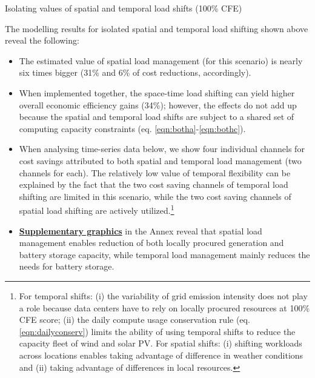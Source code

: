 \begin{frame}{Isolating values of spatial and temporal load shifts (100\% CFE)}

  {\footnotesize 

  The modelling results for isolated spatial and temporal load shifting shown above reveal the following: \\

  \begin{itemize}

    \item The estimated value of spatial load management (for this scenario) is nearly \alert{six times bigger} (31\% and 6\% of cost reductions, accordingly). 

    \item When implemented together, the space-time load shifting can yield higher overall economic efficiency gains (34\%); however, \alert{the effects do not add up} because the spatial and temporal load shifts are subject to a shared set of computing capacity constraints (eq. \ref{eqn:botha}-\ref{eqn:bothc}).

    \item When analysing time-series data below, we show four individual channels for cost savings attributed to both spatial and temporal load management (two channels for each). The relatively low value of temporal flexibility can be explained by the fact that the two cost saving channels of temporal load shifting are limited in this scenario, while the two cost saving channels of spatial load shifting are actively utilized.\footnote{{\scriptsize For temporal shifts: (i) the variability of grid emission intensity does not play a role because data centers have to rely on locally procured resources at 100\% CFE score; (ii) the daily compute usage conservation rule (eq. \ref{eqn:dailyconserv}) limits the ability of using temporal shifts to reduce the capacity fleet of wind and solar PV. For spatial shifts: (i) shifting workloads across locations enables taking advantage of difference in weather conditions and  (ii) taking advantage of differences in local resources.}}

    \item {\bf \hyperlink{isolated_spatial_cfe100_p1}{Supplementary graphics}} in the Annex reveal that spatial load management enables reduction of both locally procured generation and battery storage capacity, while temporal load management mainly reduces the needs for battery storage.\\ \vspace{0.3cm}
  
  \end{itemize}
  }
\end{frame}


